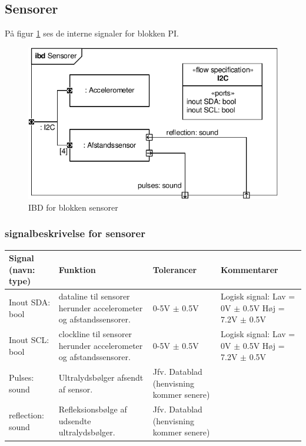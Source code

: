 \subsection{Sensorer}

På figur \ref{fig:ibd_sensorer} ses de interne signaler for blokken PI.

\begin{figure}[h]
\centering
\includegraphics[scale=1]{../fig/diagrammer/bil/ibd_sensorer.pdf}
\caption{IBD for blokken sensorer}
\label{fig:ibd_sensorer}
\end{figure}

\subsubsection{signalbeskrivelse for sensorer}

\begin{table}[h]
	\centering
	\begin{tabularx}{\textwidth}{|l|X|X|X|} \hline
	\textbf{Signal (navn: type)} & \textbf{Funktion} & \textbf{Tolerancer} & \textbf{Kommentarer} \\ \hline
Inout SDA: bool
	& \IIC dataline til sensorer herunder accelerometer og afstandssensorer. 
	& 0-5V $\pm$ 0.5V
 	& Logisk signal: \newline
		Lav = 0V $\pm$ 0.5V \newline
		Høj = 7.2V $\pm$ 0.5V
	\\ \hline

Inout SCL: bool
	& \IIC clockline  til sensorer herunder accelerometer og afstandssensorer. 
	& 0-5V $\pm$ 0.5V
 	& Logisk signal: \newline
		Lav = 0V $\pm$ 0.5V \newline
		Høj = 7.2V $\pm$ 0.5V
	\\ \hline

Pulses: sound
	& Ultralydsbølger afsendt af sensor. 
	& Jfv. Datablad (henvisning kommer senere) %
 	& ~
	\\ \hline
	
reflection: sound
	& Refleksionsbølge af udsendte ultralydsbølger. 
	& Jfv. Datablad (henvisning kommer senere) %
 	& ~
	\\ \hline
	\end{tabularx}
\end{table}